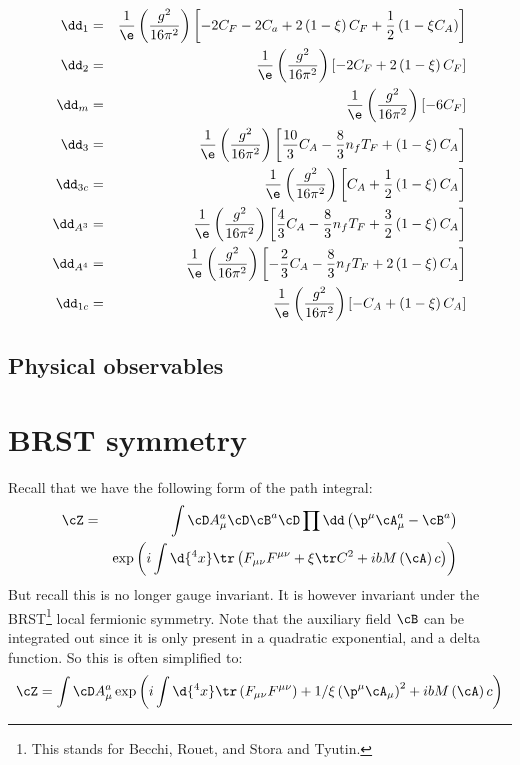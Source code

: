 \documentclass{booc}
\begin{document}
\begin{eqnarray}
\dd_1     &=&  \frac{1}{\e} \left( \frac{g^2}{16\pi^2} \right)
\left[ -2 C_F - 2C_a + 2\left( 1 - \xi \right)C_F + \frac{1}{2} \left( 1 - \xi C_A \right) \right]
\\
\dd_2     &=&  \frac{1}{\e} \left( \frac{g^2}{16\pi^2} \right) 
\left[ -2C_F + 2\left( 1 - \xi \right)C_F \right]
\\
\dd_m     &=&  \frac{1}{\e} \left( \frac{g^2}{16\pi^2} \right) 
\left[ -6C_F \right]
\\
\dd_{3}   &=&  \frac{1}{\e} \left( \frac{g^2}{16\pi^2} \right) 
\left[ \frac{10}{3} C_A - \frac{8}{3} n_f T_F + \left( 1 - \xi \right)C_A \right]
\\
\dd_{3c}  &=&  \frac{1}{\e} \left( \frac{g^2}{16\pi^2} \right) 
\left[ C_A + \frac{1}{2}\left( 1 - \xi \right)C_A \right]
\\
\dd_{A^3} &=&  \frac{1}{\e} \left( \frac{g^2}{16\pi^2} \right) 
\left[ \frac{4}{3} C_A - \frac{8}{3} n_f T_F + \frac{3}{2} \left( 1 - \xi \right)C_A \right]
\\
\dd_{A^4} &=&  \frac{1}{\e} \left( \frac{g^2}{16\pi^2} \right) 
\left[ -\frac{2}{3} C_A - \frac{8}{3}n_f T_F + 2\left( 1 - \xi \right)C_A \right]
\\
\dd_{1c}  &=&  \frac{1}{\e} \left( \frac{g^2}{16\pi^2} \right) 
\left[ -C_A + \left( 1 - \xi \right)C_A \right]
\end{eqnarray}

\subsection{Physical observables}



\section{BRST symmetry}

Recall that we have the following form of the path integral:
\begin{eqnarray}
\cZ &=&  \int \cD A_\mu^a \cD \cB^a \cD
\prod \dd\left( \p^\mu \cA_\mu^a - \cB^a \right)\\
&&\exp\left( i\int \d{^4 x} \tr\left( F_{\mu\nu}F^{\mu\nu} + 
\xi \tr C^2 + ib M\left( \cA \right) c \right) \right)
\end{eqnarray}
But recall this is no longer gauge invariant. 
It is however invariant under the BRST\footnote{
This stands for Becchi, Rouet, and Stora and Tyutin.
}
local fermionic symmetry.
Note that the auxiliary field $\cB$ can be integrated
out since it is only present in a quadratic exponential, and a delta function. 
So this is often simplified to:
\begin{equation}
\cZ = \int \cD A_\mu^a
\exp\left( i\int \d{^4 x} \tr\left( F_{\mu\nu}F^{\mu\nu} \right)
+ 1 / \xi\left( \p^\mu \cA_\mu \right)^2 + i b M\left( \cA \right)c
\right)
\end{equation}
\end{document}
